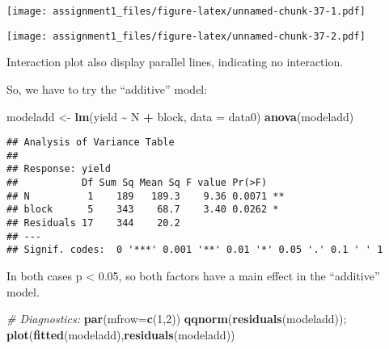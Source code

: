 \documentclass[
]{article}
\newenvironment{Shaded}{\begin{snugshade}}{\end{snugshade}}
\newcommand{\AttributeTok}[1]{\textcolor[rgb]{0.13,0.29,0.53}{#1}}
\newcommand{\CommentTok}[1]{\textcolor[rgb]{0.56,0.35,0.01}{\textit{#1}}}
\newcommand{\DecValTok}[1]{\textcolor[rgb]{0.00,0.00,0.81}{#1}}
\newcommand{\FunctionTok}[1]{\textcolor[rgb]{0.13,0.29,0.53}{\textbf{#1}}}
\newcommand{\NormalTok}[1]{#1}
\newcommand{\OtherTok}[1]{\textcolor[rgb]{0.56,0.35,0.01}{#1}}
\newcommand{\SpecialCharTok}[1]{\textcolor[rgb]{0.81,0.36,0.00}{\textbf{#1}}}
\begin{document}
\texttt{[image: assignment1\_files/figure-latex/unnamed-chunk-37-1.pdf]}

\begin{Shaded}
\end{Shaded}

\texttt{[image: assignment1\_files/figure-latex/unnamed-chunk-37-2.pdf]}

Interaction plot also display parallel lines, indicating no interaction.

So, we have to try the ``additive'' model:

\begin{Shaded}
\begin{Highlighting}[]
\NormalTok{modeladd }\OtherTok{\textless{}{-}} \FunctionTok{lm}\NormalTok{(yield }\SpecialCharTok{\textasciitilde{}}\NormalTok{ N }\SpecialCharTok{+}\NormalTok{ block, }\AttributeTok{data =}\NormalTok{ data0)}
\FunctionTok{anova}\NormalTok{(modeladd)}
\end{Highlighting}
\end{Shaded}

\begin{verbatim}
## Analysis of Variance Table
## 
## Response: yield
##           Df Sum Sq Mean Sq F value Pr(>F)   
## N          1    189   189.3    9.36 0.0071 **
## block      5    343    68.7    3.40 0.0262 * 
## Residuals 17    344    20.2                  
## ---
## Signif. codes:  0 '***' 0.001 '**' 0.01 '*' 0.05 '.' 0.1 ' ' 1
\end{verbatim}

In both cases p \textless{} 0.05, so both factors have a main effect in
the ``additive'' model.

\begin{Shaded}
\begin{Highlighting}[]
\CommentTok{\# Diagnostics:}
\FunctionTok{par}\NormalTok{(}\AttributeTok{mfrow=}\FunctionTok{c}\NormalTok{(}\DecValTok{1}\NormalTok{,}\DecValTok{2}\NormalTok{)) }
\FunctionTok{qqnorm}\NormalTok{(}\FunctionTok{residuals}\NormalTok{(modeladd)); }\FunctionTok{plot}\NormalTok{(}\FunctionTok{fitted}\NormalTok{(modeladd),}\FunctionTok{residuals}\NormalTok{(modeladd))}
\end{Highlighting}
\end{Shaded}
\end{document}
